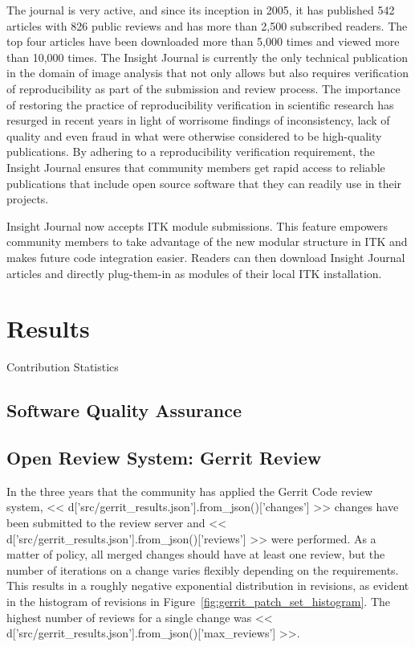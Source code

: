 \documentclass{frontiersENG} %
\begin{document}
\begin{enumeruate}
The journal is very active, and since its inception in 2005, it has published
542 articles with 826 public reviews and has more than 2,500 subscribed
readers. The top four articles have been downloaded more than 5,000 times and
viewed more than 10,000 times. The Insight Journal is currently the only
technical publication in the domain of image analysis that not only allows but
also requires verification of reproducibility as part of the submission and
review process. The importance of restoring the practice of reproducibility
verification in scientific research has resurged in recent years in light of
worrisome findings of inconsistency, lack of quality and even fraud in what
were otherwise considered to be high-quality publications. By adhering to a
reproducibility verification requirement, the Insight Journal ensures that
community members get rapid access to reliable publications that include open
source software that they can readily use in their projects.

Insight Journal now accepts ITK module submissions. This feature empowers
community members to take advantage of the new modular structure in ITK and
makes future code integration easier. Readers can then download Insight Journal
articles and directly plug-them-in as modules of their local ITK installation.


\section{Results}

Contribution Statistics
\subsection{Software Quality Assurance}

\subsection{Open Review System: Gerrit Review}
In the three years that the community has applied the Gerrit Code review
system, << d['src/gerrit_results.json'].from_json()['changes'] >> changes have
been submitted to the review server and
<< d['src/gerrit_results.json'].from_json()['reviews'] >> were performed.
As a matter of policy, all merged changes should have at least one review,
but the number of iterations on a change varies flexibly depending on the
requirements. This results in a roughly negative exponential distribution in
revisions, as evident in the histogram of revisions in
Figure~\ref{fig:gerrit_patch_set_histogram}.  The highest number of reviews
for a single change was
<< d['src/gerrit_results.json'].from_json()['max_reviews'] >>.


\end{enumeruate}
\end{document}
